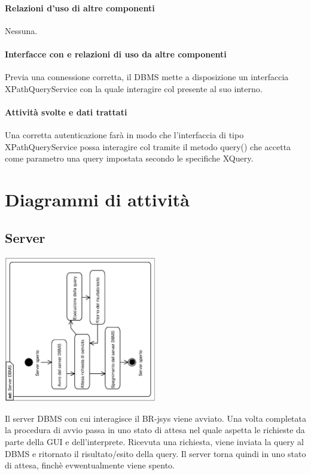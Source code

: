 \documentclass[11pt,titlepage,a4paper]{report}
\begin{document}
\subsubsection{Relazioni d'uso di altre componenti}
Nessuna.
\subsubsection{Interfacce con e relazioni di uso da altre componenti}
Previa una connessione corretta, il DBMS mette a disposizione un interfaccia XPathQueryService con la quale interagire col \re  presente al suo interno.
\subsubsection{Attivit\`a svolte e dati trattati}
Una corretta autenticazione far\`a in modo che l'interfaccia di tipo XPathQueryService possa interagire col \re tramite il metodo query() che accetta come parametro una query impostata secondo le specifiche XQuery.


\chapter{Diagrammi di attivit\`a}


\section{Server}
\begin{center}
 \includegraphics[width=0.5\textwidth, angle=-90]{Server.eps}
\end{center}
Il server DBMS con cui interagisce il BR-jsys viene avviato. Una volta completata la procedura di avvio passa in uno stato di attesa nel quale aspetta le richieste da parte della GUI e dell'interprete. Ricevuta una richiesta, viene inviata la query al DBMS e ritornato il risultato/esito della query. Il server torna quindi in uno stato di attesa, finch\`e evwentualmente viene spento.
\end{document}
